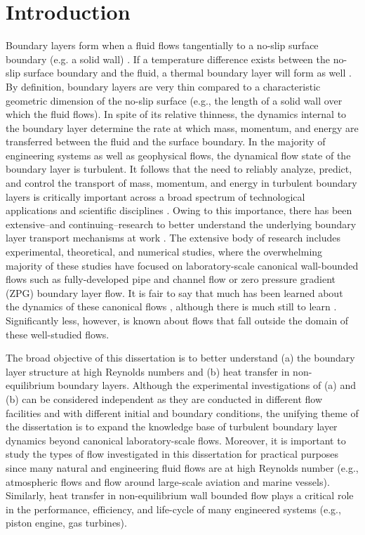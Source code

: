 \chapter{Introduction}

Boundary layers form when a fluid flows tangentially to a no-slip surface boundary (e.g. a solid wall) \cite{Prandtl1905}.  If a temperature difference exists between the no-slip surface boundary and the fluid, a thermal boundary layer will form as well \cite{Kays1980}.  By definition, boundary layers are very thin compared to a characteristic geometric dimension of the no-slip surface (e.g., the length of a solid wall over which the fluid flows). In spite of its relative thinness, the dynamics internal to the boundary layer determine the rate at which mass, momentum, and energy are transferred between the fluid and the surface boundary. In the majority of engineering systems as well as geophysical flows, the dynamical flow state of the boundary layer is turbulent.  It follows that the need to reliably analyze, predict, and control the transport of mass, momentum, and energy in turbulent boundary layers is critically important across a broad spectrum of technological applications and scientific disciplines \cite{Fox2012}. Owing to this importance, there has been extensive--and continuing--research to better understand the underlying boundary layer transport mechanisms at work \cite{Clauser1956}. The extensive body of research includes experimental, theoretical, and numerical studies, where the overwhelming majority of these studies have focused on laboratory-scale canonical wall-bounded flows such as fully-developed pipe and channel flow or zero pressure gradient (ZPG) boundary layer flow. It is fair to say that much has been learned about the dynamics of these canonical flows \cite{Sreenivasan1997}, although there is much still to learn \cite{Sreenivasan1999, Jimenez2012}. Significantly less, however, is known about flows that fall outside the domain of these well-studied flows. 

The broad objective of this dissertation is to better understand (a) the boundary layer structure at high Reynolds numbers and (b) heat transfer in non-equilibrium boundary layers.  Although the experimental investigations of (a) and (b) can be considered independent as they are conducted in different flow facilities and with different initial and boundary conditions, the unifying theme of the dissertation is to expand the knowledge base of turbulent boundary layer dynamics beyond canonical laboratory-scale flows. Moreover, it is important to study the types of flow investigated in this dissertation for practical purposes since many natural and engineering fluid flows are at high Reynolds number (e.g., atmospheric flows and flow around large-scale aviation and marine vessels). Similarly, heat transfer in non-equilibrium wall bounded flow plays a critical role in the performance, efficiency, and life-cycle of many engineered systems (e.g., piston engine, gas turbines).

